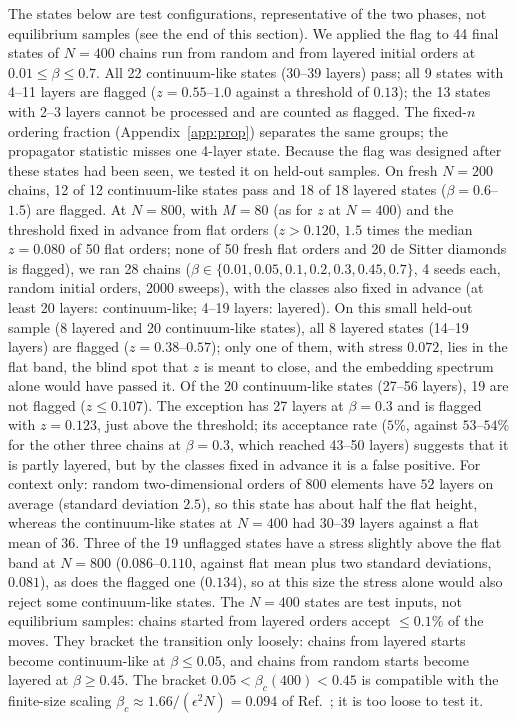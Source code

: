 \documentclass[prd,twocolumn,superscriptaddress,nofootinbib,amsmath,amssymb,floatfix]{revtex4-2}
\begin{document}
The states below are test configurations, representative of the two phases, not equilibrium samples (see the end of this section). We applied the flag to 44 final states of $N=400$ chains run from random and from layered initial orders at $0.01\leq\beta\leq0.7$. All 22 continuum-like states (30--39 layers) pass; all 9 states with 4--11 layers are flagged ($z=0.55$--$1.0$ against a threshold of $0.13$); the 13 states with 2--3 layers cannot be processed and are counted as flagged. The fixed-$n$ ordering fraction (Appendix~\ref{app:prop}) separates the same groups; the propagator statistic misses one 4-layer state. Because the flag was designed after these states had been seen, we tested it on held-out samples. On fresh $N=200$ chains, 12 of 12 continuum-like states pass and 18 of 18 layered states ($\beta=0.6$--$1.5$) are flagged. At $N=800$, with $M=80$ (as for $z$ at $N=400$) and the threshold fixed in advance from flat orders ($z>0.120$, $1.5$ times the median $z=0.080$ of 50 flat orders; none of 50 fresh flat orders and 20 de Sitter diamonds is flagged), we ran 28 chains ($\beta\in\{0.01,0.05,0.1,0.2,0.3,0.45,0.7\}$, 4 seeds each, random initial orders, 2000 sweeps), with the classes also fixed in advance (at least 20 layers: continuum-like; 4--19 layers: layered). On this small held-out sample (8 layered and 20 continuum-like states), all 8 layered states (14--19 layers) are flagged ($z=0.38$--$0.57$); only one of them, with stress $0.072$, lies in the flat band, the blind spot that $z$ is meant to close, and the embedding spectrum alone would have passed it. Of the 20 continuum-like states (27--56 layers), 19 are not flagged ($z\leq0.107$). The exception has 27 layers at $\beta=0.3$ and is flagged with $z=0.123$, just above the threshold; its acceptance rate ($5\%$, against $53$--$54\%$ for the other three chains at $\beta=0.3$, which reached 43--50 layers) suggests that it is partly layered, but by the classes fixed in advance it is a false positive. For context only: random two-dimensional orders of $800$ elements have $52$ layers on average (standard deviation $2.5$), so this state has about half the flat height, whereas the continuum-like states at $N=400$ had $30$--$39$ layers against a flat mean of $36$. Three of the 19 unflagged states have a stress slightly above the flat band at $N=800$ ($0.086$--$0.110$, against flat mean plus two standard deviations, $0.081$), as does the flagged one ($0.134$), so at this size the stress alone would also reject some continuum-like states. The $N=400$ states are test inputs, not equilibrium samples: chains started from layered orders accept $\leq0.1\%$ of the moves. They bracket the transition only loosely: chains from layered starts become continuum-like at $\beta\leq0.05$, and chains from random starts become layered at $\beta\geq0.45$. The bracket $0.05<\beta_c(400)<0.45$ is compatible with the finite-size scaling $\beta_c\approx1.66/(\epsilon^2N)=0.094$ of Ref.~\cite{GOS18}; it is too loose to test it.
\end{document}
